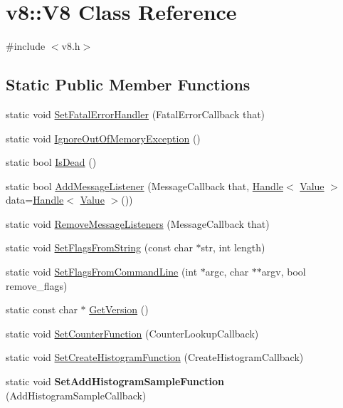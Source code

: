 \hypertarget{classv8_1_1_v8}{}\section{v8\+:\+:V8 Class Reference}
\label{classv8_1_1_v8}


{\ttfamily \#include $<$v8.\+h$>$}

\subsection*{Static Public Member Functions}
\begin{DoxyCompactItemize}
\item 
static void \hyperlink{classv8_1_1_v8_ab386f81a6d58dcf481d00446e8d15c9e}{Set\+Fatal\+Error\+Handler} (Fatal\+Error\+Callback that)
\item 
static void \hyperlink{classv8_1_1_v8_a1058ff39b32a17976df1e2b75c3d1cb4}{Ignore\+Out\+Of\+Memory\+Exception} ()
\item 
static bool \hyperlink{classv8_1_1_v8_a0d5593ecf0d41035e4d9ee512119f0b7}{Is\+Dead} ()
\item 
static bool \hyperlink{classv8_1_1_v8_a125dadf8feb6178a42333f2a6412ea73}{Add\+Message\+Listener} (Message\+Callback that, \hyperlink{classv8_1_1_handle}{Handle}$<$ \hyperlink{classv8_1_1_value}{Value} $>$ data=\hyperlink{classv8_1_1_handle}{Handle}$<$ \hyperlink{classv8_1_1_value}{Value} $>$())
\item 
static void \hyperlink{classv8_1_1_v8_a024f57744e8dfdcb2ea1417024b4805c}{Remove\+Message\+Listeners} (Message\+Callback that)
\item 
static void \hyperlink{classv8_1_1_v8_ab263a85e6f97ea79d944bd20bb09a95f}{Set\+Flags\+From\+String} (const char $\ast$str, int length)
\item 
static void \hyperlink{classv8_1_1_v8_a63157ad9284ffad1c0ab62b21aadd08c}{Set\+Flags\+From\+Command\+Line} (int $\ast$argc, char $\ast$$\ast$argv, bool remove\+\_\+flags)
\item 
static const char $\ast$ \hyperlink{classv8_1_1_v8_afcecc0e9e8b5fa17a06a93f7b5a7538d}{Get\+Version} ()
\item 
static void \hyperlink{classv8_1_1_v8_a830d3ba2704b6e7c361188b22318c0be}{Set\+Counter\+Function} (Counter\+Lookup\+Callback)
\item 
static void \hyperlink{classv8_1_1_v8_ac4db0dff0f29c750d30fcac65c4d1968}{Set\+Create\+Histogram\+Function} (Create\+Histogram\+Callback)
\item 
\hypertarget{classv8_1_1_v8_acbd552ca4282f1a7648c221aa70ff93e}{}static void {\bfseries Set\+Add\+Histogram\+Sample\+Function} (Add\+Histogram\+Sample\+Callback)\label{classv8_1_1_v8_acbd552ca4282f1a7648c221aa70ff93e}


\end{DoxyCompactItemize}
